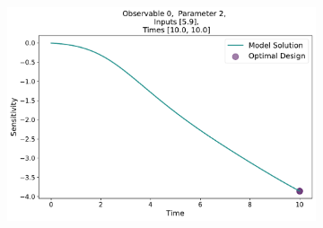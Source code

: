 \documentclass[10pt,A4paper]{article}
\begin{document}
\begin{figure}[H]
\begin{subfigure}{.9\textwidth}
    \end{subfigure}
    \begin{subfigure}{.9\textwidth}
        \centering
        \includegraphics[scale=0.35]{Figures/Sensitivity_Results_baranyi_roberts_ode_fisher_determinant_rel_sensit_cont_2times_2temps_000_x_00_p_02.pdf}
    \end{subfigure}
\end{figure}%
\end{document}

